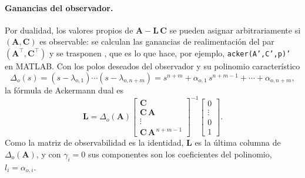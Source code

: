 \paragraph{Ganancias del observador.} Por dualidad, los valores propios de
$\mathbf{A} - \mathbf{L}\,\mathbf{C}$ se pueden asignar arbitrariamente si
$(\mathbf{A}, \mathbf{C})$ es observable: se calculan las ganancias de
realimentación del par $(\mathbf{A}^{\top}, \mathbf{C}^{\top})$ y se trasponen
\cite[teo.~8.O3]{chen1999linear}, que es lo que hace, por ejemplo,
\texttt{acker(A',C',p)'} en MATLAB. Con los polos deseados del observador y su
polinomio característico
\begin{equation}
\Delta_o(s) = (s - \lambda_{o,1}) \cdots (s - \lambda_{o,n+m})
= s^{n+m} + \alpha_{o,1}\, s^{n+m-1} + \cdots + \alpha_{o,n+m},
\end{equation}
la fórmula de Ackermann dual es
\begin{equation}
\mathbf{L} = \Delta_o(\mathbf{A})
\begin{bmatrix}
\mathbf{C} \\ \mathbf{C}\,\mathbf{A} \\ \vdots \\ \mathbf{C}\,\mathbf{A}^{\,n+m-1}
\end{bmatrix}^{-1}
\begin{bmatrix} 0 \\ \vdots \\ 0 \\ 1 \end{bmatrix} .
\label{eq:ackermann_L}
\end{equation}
Como la matriz de observabilidad es la identidad, $\mathbf{L}$ es la última
columna de $\Delta_o(\mathbf{A})$, y con $\gamma_i = 0$ sus componentes son los
coeficientes del polinomio, $l_i = \alpha_{o,i}$.

